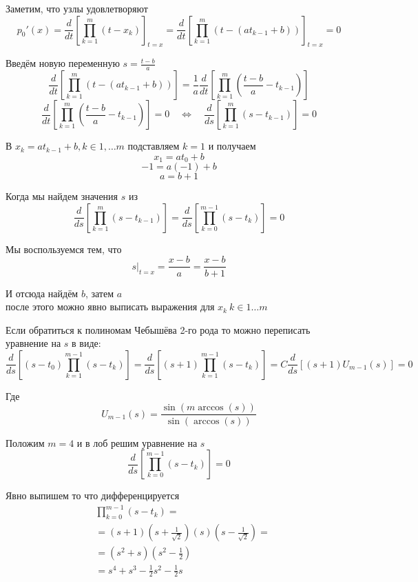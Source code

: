\documentclass[12pt,a4paper]{article}
\begin{document}
	
	\noindent Заметим, что узлы удовлетворяют
	\[
	p_0'(x) = 
	\frac{d}{dt} \left[\prod_{k=1}^{m} (t - x_k) \right]_{t=x} = 
	\frac{d}{dt} \left[\prod_{k=1}^{m} (t - (at_{k-1} + b) ) \right]_{t=x} = 
	0
	\]
	
	\noindent Введём новую переменную $s = \frac{t-b}{a}$
	\[
	\frac{d}{dt} \left[\prod_{k=1}^{m} (t - (at_{k-1} + b) ) \right] =
	\frac{1}{a}\frac{d}{dt} \left[\prod_{k=1}^{m} \left( \frac{t-b}{a} - t_{k-1} \right) \right] 
	\]
	\[
	\frac{d}{dt} \left[\prod_{k=1}^{m} \left( \frac{t-b}{a} - t_{k-1} \right) \right] = 0 
	\quad \Longleftrightarrow \quad
	\frac{d}{ds} \left[\prod_{k=1}^{m} \left( s - t_{k-1} \right) \right] = 0
	\]
	
	\noindent В $x_k = a t_{k-1} + b, k \in 1, \ldots m$ подставляем $k=1$ и получаем
	\[
	x_1 = a t_0 + b
	\]
	\[
	-1 = a (-1) + b
	\]
	\[
	a = b + 1
	\]
	
	\noindent Когда мы найдем значения $s$ из
	\[
	\frac{d}{ds} \left[\prod_{k=1}^{m} \left( s - t_{k-1} \right) \right] = 
	\frac{d}{ds} \left[\prod_{k=0}^{m-1} \left( s - t_{k} \right) \right] = 0
	\]
	
	\noindent Мы воспользуемся тем, что
	\[
	s |_{t=x} = \frac{x-b}{a} = \frac{x-b}{b+1}
	\]
	
	\noindent И отсюда найдём $b$, затем $a$ \\
	после этого можно явно выписать выражения для $x_k \  k \in 1 \ldots m$
	
	\noindent Если обратиться к полиномам Чебышёва 2-го рода то можно переписать уравнение на $s$ в виде:
	\[
	\frac{d}{ds} \left[ (s-t_0) \prod_{k=1}^{m-1} \left( s - t_{k} \right) \right] = 
	\frac{d}{ds} \left[ (s+1) \prod_{k=1}^{m-1} \left( s - t_{k} \right) \right] = 
	C \frac{d}{ds} \left[ (s+1) U_{m-1}(s) \right] = 0
	\]
	
	\noindent Где
	\[
	U_{m-1}(s) = \frac{\sin(m \arccos(s))}{\sin(\arccos(s))}
	\]
	
	\noindent Положим $m=4$ и в лоб решим уравнение на $s$
	\[
	\frac{d}{ds} \left[\prod_{k=0}^{m-1} \left( s - t_{k} \right) \right] = 0
	\]
	
	\noindent Явно выпишем то что дифференцируется
	\begin{align*}
	&\prod_{k=0}^{m-1} \left( s - t_{k} \right) = \\
	&= (s + 1) \left(s + \frac{1}{\sqrt2} \right) (s) \left(s - \frac{1}{\sqrt2} \right) = \\
	&= (s^2 + s) \left( s^2 - \frac{1}{2} \right) \\
	&= s^4 + s^3 - \frac{1}{2}s^2 - \frac{1}{2}s 
	\end{align*}
	
\end{document}
